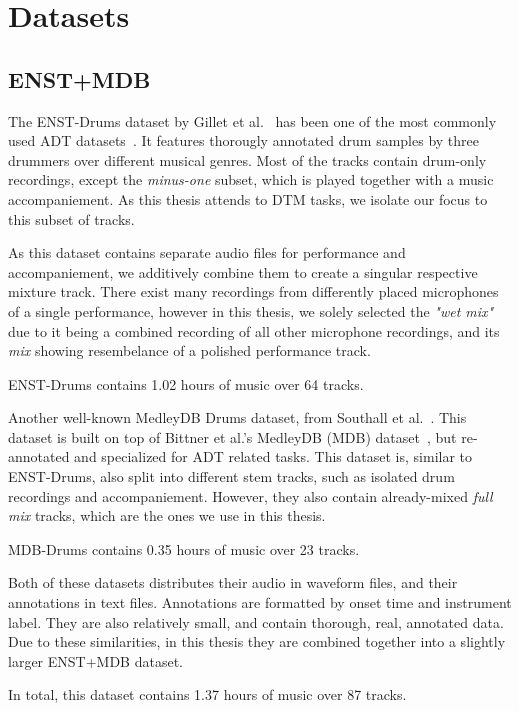 \chapter{Datasets}

\section{ENST+MDB}

The ENST-Drums dataset by Gillet et al.~\cite{gillet_2006_7432188} has been one of the most commonly used \gls{ADT} datasets~\cite{8350302}. It features thorougly annotated drum samples by three drummers over different musical genres. Most of the tracks contain drum-only recordings, except the \textit{minus-one} subset, which is played together with a music accompaniement. As this thesis attends to \gls{DTM} tasks, we isolate our focus to this subset of tracks.

As this dataset contains separate audio files for performance and accompaniement, we additively combine them to create a singular respective mixture track. There exist many recordings from differently placed microphones of a single performance, however in this thesis, we solely selected the \textit{"wet mix"} due to it being a combined recording of all other microphone recordings, and its \textit{mix} showing resembelance of a polished performance track.

ENST-Drums contains 1.02 hours of music over 64 tracks.

Another well-known MedleyDB Drums dataset, from Southall et al.~\cite{southall2017mdb}. This dataset is built on top of Bittner et al.'s MedleyDB (MDB) dataset~\cite{rachel_bittner_2014_1438309}, but re-annotated and specialized for \gls{ADT} related tasks. This dataset is, similar to ENST-Drums, also split into different stem tracks, such as isolated drum recordings and accompaniement. However, they also contain already-mixed \textit{full mix} tracks, which are the ones we use in this thesis.

MDB-Drums contains 0.35 hours of music over 23 tracks.

Both of these datasets distributes their audio in waveform files, and their annotations in text files. Annotations are formatted by onset time and instrument label. They are also relatively small, and contain thorough, real, annotated data. Due to these similarities, in this thesis they are combined together into a slightly larger ENST+MDB dataset.

In total, this dataset contains 1.37 hours of music over 87 tracks.

